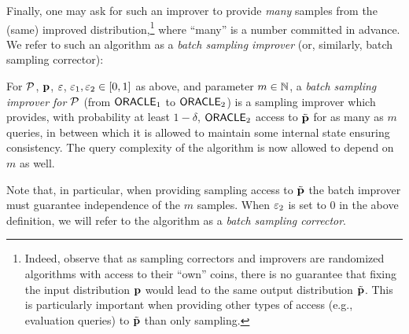 Finally, one may ask for such an improver to provide \emph{many} samples from the (same) improved distribution,\footnote{Indeed, observe that as sampling correctors and improvers are randomized algorithms with access to their ``own'' coins, there is no guarantee that fixing the input distribution $\mathbf{p}$ would lead to the same output distribution $\tilde{\mathbf{p}}$. This is particularly important when providing other types of access (e.g., evaluation queries) to $\tilde{\mathbf{p}}$ than only sampling.} where ``many'' is a number committed in advance. We refer to such an algorithm as a \emph{batch sampling improver} {(or, similarly, batch sampling corrector):}
\begin{definition}\label{def:sampling:corrector:batch}
  For $\mathcal{P}$, $\mathbf{p}$, $\varepsilon$, $\varepsilon_1,\varepsilon_2\in[0,1]$ as above, and parameter $m\in\mathbb{N}$, a \emph{batch sampling improver for $\mathcal{P}$} (from ${\sf ORACLE}_1$ to ${\sf ORACLE}_2$) is a sampling improver which provides, with probability at least $1-\delta$, ${\sf ORACLE}_2$ access to $\tilde{\mathbf{p}}$ for as many as $m$ queries, in between which it is allowed to maintain some internal state ensuring consistency. The query complexity of the algorithm is now allowed to depend on $m$ as well.
  
  \noindent Note that, in particular, when providing sampling access to $\tilde{\mathbf{p}}$ the batch improver must guarantee independence of the $m$ samples. When $\varepsilon_2$ is set to 0 in the above definition, we will refer to the algorithm as a \emph{batch sampling corrector}.
\end{definition}

